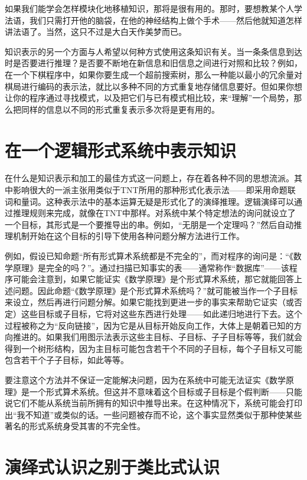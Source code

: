 如果我们能学会怎样模块化地移植知识，那将是很有用的。那时，要想教某个人学法语，我们只需打开他的脑袋，在他的神经结构上做个手术——然后他就知道怎样讲法语了。当然，这只不过是大白天作美梦而已。

知识表示的另一个方面与人希望以何种方式使用这条知识有关。当一条条信息到达时是否要进行推理？是否要不断地在新信息和旧信息之间进行对照和比较？例如，在一个下棋程序中，如果你要生成一个超前搜索树，那么一种能以最小的冗余量对棋局进行编码的表示法，就比以多种不同的方式重复地存储信息要好。但如果你想让你的程序通过寻找模式，以及把它们与已有模式相比较，来“理解”一个局势，那么把同样的信息以不同的形式重复表示多次将是更有用的。

\section{在一个逻辑形式系统中表示知识}

在什么是知识表示和加工的最佳方式这一问题上，存在着各种不同的思想流派。其中影响很大的一派主张用类似于TNT所用的那种形式化表示法——即采用命题联词和量词。这种表示法中的基本运算无疑是形式化了的演绎推理。逻辑演绎可以通过推理规则来完成，就像在TNT中那样。对系统中某个特定想法的询问就设立了一个目标，其形式是一个要推导出的串。例如，“无朋是一个定理吗？”然后自动推理机制开始在这个目标的引导下使用各种问题分解方法进行工作。

例如，假设已知命题“所有形式算术系统都是不完全的”，而对程序的询问是：“《数学原理》是完全的吗？”。通过扫描已知事实的表——通常称作“数据库”——该程序可能会注意到，如果它能证实《数学原理》是个形式算术系统，那它就能回答上述问题。因此命题“《数学原理》是个形式算术系统吗？”就可能被当作一个子目标来设立，然后再进行问题分解。如果它能找到更进一步的事实来帮助它证实（或否定）这些目标或子目标，它将对这些东西进行处理——如此递归地进行下去。这个过程被称之为“反向链接”，因为它是从目标开始反向工作，大体上是朝着已知的方向推进的。如果我们用图示法表示这些主目标、子目标、子子目标等等，我们就会得到一个树形结构，因为主目标可能包含若干个不同的子目标，每个子目标又可能包含若干个子子目标，如此等等。

要注意这个方法并不保证一定能解决问题，因为在系统中可能无法证实《数学原理》是一个形式算术系统。但这并不意味着这个目标或子目标是个假判断——只能说它们不能从系统当前所拥有的知识中推导出来。在这种情况下，系统可能会打印出“我不知道”或类似的话。一些问题被存而不论，这个事实显然类似于那种使某些著名的形式系统身受其害的不完全性。

\section{演绎式认识之别于类比式认识}

